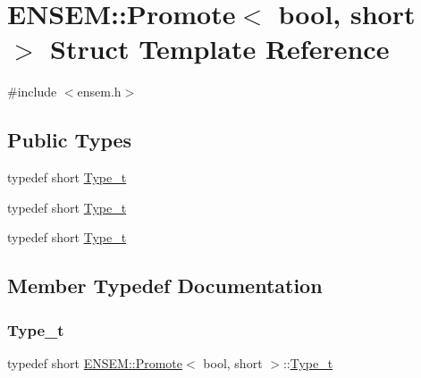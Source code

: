\hypertarget{structENSEM_1_1Promote_3_01bool_00_01short_01_4}{}\section{E\+N\+S\+EM\+:\+:Promote$<$ bool, short $>$ Struct Template Reference}
\label{structENSEM_1_1Promote_3_01bool_00_01short_01_4}


{\ttfamily \#include $<$ensem.\+h$>$}

\subsection*{Public Types}
\begin{DoxyCompactItemize}
\item 
typedef short \mbox{\hyperlink{structENSEM_1_1Promote_3_01bool_00_01short_01_4_a3a13222623387509ba3bc981fe9b2d4f}{Type\+\_\+t}}
\item 
typedef short \mbox{\hyperlink{structENSEM_1_1Promote_3_01bool_00_01short_01_4_a3a13222623387509ba3bc981fe9b2d4f}{Type\+\_\+t}}
\item 
typedef short \mbox{\hyperlink{structENSEM_1_1Promote_3_01bool_00_01short_01_4_a3a13222623387509ba3bc981fe9b2d4f}{Type\+\_\+t}}
\end{DoxyCompactItemize}


\subsection{Member Typedef Documentation}
\mbox{\label{structENSEM_1_1Promote_3_01bool_00_01short_01_4_a3a13222623387509ba3bc981fe9b2d4f}} 
\subsubsection{\texorpdfstring{Type\_t}{Type\_t}\hspace{0.1cm}{\footnotesize\ttfamily [1/3]}}
{\footnotesize\ttfamily typedef short \mbox{\hyperlink{structENSEM_1_1Promote}{E\+N\+S\+E\+M\+::\+Promote}}$<$ bool, short $>$\+::\mbox{\hyperlink{structENSEM_1_1Promote_3_01bool_00_01short_01_4_a3a13222623387509ba3bc981fe9b2d4f}{Type\+\_\+t}}}

